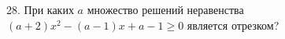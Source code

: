 28. При каких $a$ множество решений неравенства $(a+2)x^2-(a-1)x+a-1\geqslant0$ является отрезком?\\

